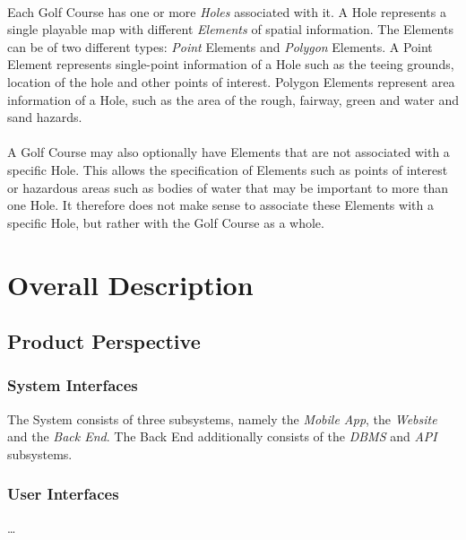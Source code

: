 \documentclass{article}
\begin{document}
    \paragraph{}
    Each Golf Course has one or more \textit{Holes} associated with it. A Hole
    represents a single playable map with different \textit{Elements} of spatial
    information. The Elements can be of two different types: \textit{Point}
    Elements and \textit{Polygon} Elements. A Point Element represents
    single-point information of a Hole such as the teeing grounds, location of
    the hole and other points of interest. Polygon Elements represent area
    information of a Hole, such as the area of the rough, fairway, green and
    water and sand hazards.

    \paragraph{}
    A Golf Course may also optionally have Elements that are not associated with
    a specific Hole. This allows the specification of Elements such as points of
    interest or hazardous areas such as bodies of water that may be important to
    more than one Hole. It therefore does not make sense to associate these
    Elements with a specific Hole, but rather with the Golf Course as a whole.

    \newpage

    \section{Overall Description} 

    \subsection{Product Perspective}

    \subsubsection{System Interfaces}
    The System consists of three subsystems, namely the \textit{Mobile App},
    the \textit{Website} and the \textit{Back End}. The Back End additionally
    consists of the \textit{DBMS} and \textit{API} subsystems.

    \subsubsection{User Interfaces}
    \ldots
\end{document}
